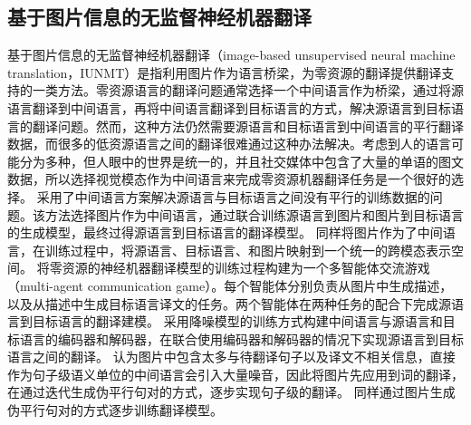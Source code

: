 
\subsection{基于图片信息的无监督神经机器翻译}

基于图片信息的无监督神经机器翻译（image-based unsupervised neural machine translation，IUNMT）是指利用图片作为语言桥梁，为零资源的翻译提供翻译支持的一类方法。零资源语言的翻译问题通常选择一个中间语言作为桥梁，通过将源语言翻译到中间语言，再将中间语言翻译到目标语言的方式，解决源语言到目标语言的翻译问题。然而，这种方法仍然需要源语言和目标语言到中间语言的平行翻译数据，而很多的低资源语言之间的翻译很难通过这种办法解决。考虑到人的语言可能分为多种，但人眼中的世界是统一的，并且社交媒体中包含了大量的单语的图文数据，所以选择视觉模态作为中间语言来完成零资源机器翻译任务是一个很好的选择。
采用了中间语言方案解决源语言与目标语言之间没有平行的训练数据的问题。该方法选择图片作为中间语言，通过联合训练源语言到图片和图片到目标语言的生成模型，最终过得源语言到目标语言的翻译模型。
同样将图片作为了中间语言，在训练过程中，将源语言、目标语言、和图片映射到一个统一的跨模态表示空间。
将零资源的神经机器翻译模型的训练过程构建为一个多智能体交流游戏（multi-agent communication game）。每个智能体分别负责从图片中生成描述，以及从描述中生成目标语言译文的任务。两个智能体在两种任务的配合下完成源语言到目标语言的翻译建模。
采用降噪模型的训练方式构建中间语言与源语言和目标语言的编码器和解码器，在联合使用编码器和解码器的情况下实现源语言到目标语言之间的翻译。
认为图片中包含太多与待翻译句子以及译文不相关信息，直接作为句子级语义单位的中间语言会引入大量噪音，因此将图片先应用到词的翻译，在通过迭代生成伪平行句对的方式，逐步实现句子级的翻译。
同样通过图片生成伪平行句对的方式逐步训练翻译模型。

